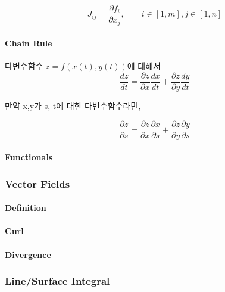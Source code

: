 \begin{definition} 
\begin{equation}
J_{ij} = \frac{\partial f_i}{\partial x_j}, \qquad i \in [1, m], j \in [1, n]
\end{equation}
\end{definition}

\paragraph{Chain Rule} 

다변수함수 $z = f(x(t), y(t))$에 대해서 
\begin{equation} 
\frac{dz}{dt} = \frac{\partial z}{\partial x} \frac{dx}{dt} + \frac{\partial z}{\partial y}\frac{dy}{dt}
\end{equation}

만약 x,y가 s, t에 대한 다변수함수라면, 

\begin{equation}
\frac{\partial z}{\partial s} = \frac{\partial z}{\partial x}\frac{\partial x}{\partial s} + \frac{\partial z}{\partial y}\frac{\partial y}{\partial s}
\end{equation}

\paragraph{Functionals} 


\subsubsection{Vector Fields}

\paragraph{Definition} 

\paragraph{Curl}

\paragraph{Divergence}



\subsubsection{Line/Surface Integral} 

